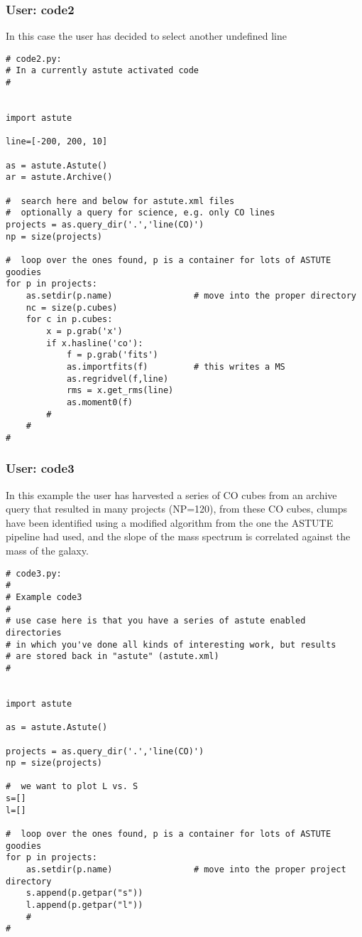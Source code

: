 \documentclass[preprint]{aastex} %
\begin{document}
\subsubsection{User: code2}

In this case the user has decided to select another undefined line

\footnotesize
\begin{verbatim}
# code2.py:
# In a currently astute activated code
#


import astute

line=[-200, 200, 10]

as = astute.Astute()
ar = astute.Archive()

#  search here and below for astute.xml files
#  optionally a query for science, e.g. only CO lines
projects = as.query_dir('.','line(CO)')
np = size(projects)

#  loop over the ones found, p is a container for lots of ASTUTE goodies
for p in projects:
    as.setdir(p.name)                # move into the proper directory
    nc = size(p.cubes)
    for c in p.cubes:
        x = p.grab('x')
        if x.hasline('co'):
            f = p.grab('fits')
            as.importfits(f)         # this writes a MS
            as.regridvel(f,line)
            rms = x.get_rms(line)
            as.moment0(f)
        #
    #
#

\end{verbatim}
\normalsize


\subsubsection{User: code3}

In this example the user has harvested a series of CO cubes from
an archive query  that resulted in many projects (NP=120), 
from these CO cubes, clumps have been identified using a modified
algorithm from the one the ASTUTE pipeline had used, and the slope
of the mass  spectrum is correlated against the mass of the galaxy.

\footnotesize
\begin{verbatim}
# code3.py:
#
# Example code3
#
# use case here is that you have a series of astute enabled directories
# in which you've done all kinds of interesting work, but results
# are stored back in "astute" (astute.xml)
#


import astute

as = astute.Astute()

projects = as.query_dir('.','line(CO)')
np = size(projects)

#  we want to plot L vs. S
s=[]
l=[]

#  loop over the ones found, p is a container for lots of ASTUTE goodies
for p in projects:
    as.setdir(p.name)                # move into the proper project directory
    s.append(p.getpar("s"))
    l.append(p.getpar("l"))
    #
#

\end{verbatim}
\normalsize
\end{document}
